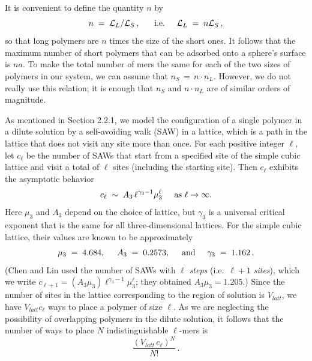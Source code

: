 \documentclass[journal=mamobx,manuscript=article]{achemso}
\newcommand{\leng}{\mathcal{L}}
\begin{document}
It is convenient to define the quantity $n$ by \begin{equation}
   \label{eq.ndefn}
    n\;=\;\leng_L/\leng_S  \,,  \hspace{6mm}\hbox{i.e.}
     \hspace{5mm}  \leng_L  \;=\;  n\leng_S \,,
\end{equation}
so that
long polymers are $n$ times the size of the short ones.
It follows that the maximum number of short polymers
that can be adsorbed onto a sphere's surface is $na$.
To make the total %
number of mers the same for each
of the two sizes of polymers in our system,
we can assume that $n_S \,=\, n\cdot n_L$.  However, we do not really use this relation; it is enough that $n_S$ and $n\cdot n_L$
are of similar orders of magnitude.



As mentioned in Section 2.2.1, we model the configuration of a single  polymer in a dilute solution by a self-avoiding walk (SAW) in a lattice, which is a path in the lattice that does not visit any site more than once.
For each positive integer $\ell$, let $c_{\ell}$ be
the number of SAWs that start from a specified site of the simple cubic lattice and visit a total of $\ell$ sites (including the starting site).
Then $c_{\ell}$ exhibits the asymptotic
behavior\cite{Madras2013} 
\begin{equation}
    \label{eq.sawscale}
       c_{\ell}  \;\sim  \;  A_3 \, {\ell}^{\gamma_3-1}  \mu_3^{\ell}    \hspace{5mm}\hbox{as $\ell\rightarrow\infty$}.
\end{equation}
Here $\mu_3$ and $A_3$ depend on the choice of lattice, but $\gamma_3$ is a universal critical exponent
that is the same for all three-dimensional lattices.  
For the simple cubic lattice, 
their values are known to be approximately \cite{Chen2002,Madras2013}
\begin{equation}
   \label{eq.gammas}   \mu_3 \;=\;  4.684, \hspace{5mm}
        A_3 \;=\;  0.2573,    \hspace{5mm}\hbox{and}\hspace{5mm}
   \gamma_3 \;=\;  1.162 \,.  %
\end{equation}
(Chen and Lin\cite{Chen2002} used the 
number of SAWs with $\ell$ \textit{steps} (i.e.\ $\ell+1$ \textit{sites}), which we write  $c_{\ell+1}=(A_3\mu_3)\ell^{\gamma_3-1}\mu_3^{\ell}$; %
they obtained $A_3\mu_3=1.205$.)
Since the number of sites in the lattice corresponding to the region of solution is $V_{latt}$, 
we have $V_{latt}c_{\ell}$ ways to place a polymer of size ${\ell}$.  As we are neglecting the
possibility of overlapping polymers in the dilute solution, it follows that the number of ways to 
place $N$ indistinguishable $\ell$-mers is 
\begin{equation}
  \label{eq.Npoly}
   \frac{(V_{latt}\,c_{\ell})^N}{N!}  \,.   
\end{equation}
\end{document}
